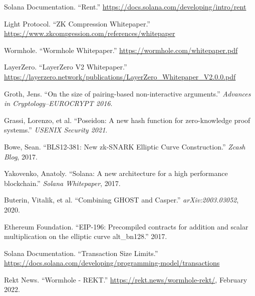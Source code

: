 \documentclass[11pt,a4paper,twoside]{article}
\begin{document}
\begin{enumerate}[label={[\arabic*]}]
    \item \label{solana-rent} Solana Documentation. ``Rent.'' \url{https://docs.solana.com/developing/intro/rent}
    
    \item \label{light-protocol} Light Protocol. ``ZK Compression Whitepaper.'' \url{https://www.zkcompression.com/references/whitepaper}
    
    \item \label{wormhole} Wormhole. ``Wormhole Whitepaper.'' \url{https://wormhole.com/whitepaper.pdf}
    
    \item \label{layerzero} LayerZero. ``LayerZero V2 Whitepaper.'' \url{https://layerzero.network/publications/LayerZero_Whitepaper_V2.0.0.pdf}
    
    \item \label{groth16} Groth, Jens. ``On the size of pairing-based non-interactive arguments.'' \textit{Advances in Cryptology--EUROCRYPT 2016}.
    
    \item \label{poseidon} Grassi, Lorenzo, et al. ``Poseidon: A new hash function for zero-knowledge proof systems.'' \textit{USENIX Security 2021}.
    
    \item \label{bls12-381} Bowe, Sean. ``BLS12-381: New zk-SNARK Elliptic Curve Construction.'' \textit{Zcash Blog}, 2017.
    
    \item \label{solana-whitepaper} Yakovenko, Anatoly. ``Solana: A new architecture for a high performance blockchain.'' \textit{Solana Whitepaper}, 2017.
    
    \item \label{gasper} Buterin, Vitalik, et al. ``Combining GHOST and Casper.'' \textit{arXiv:2003.03052}, 2020.
    
    \item \label{eip196} Ethereum Foundation. ``EIP-196: Precompiled contracts for addition and scalar multiplication on the elliptic curve alt\_bn128.'' 2017.
    
    \item \label{solana-tx} Solana Documentation. ``Transaction Size Limits.'' \url{https://docs.solana.com/developing/programming-model/transactions}
    
    \item \label{wormhole-rekt} Rekt News. ``Wormhole - REKT.'' \url{https://rekt.news/wormhole-rekt/}, February 2022.
    

\end{enumerate}
\end{document}
